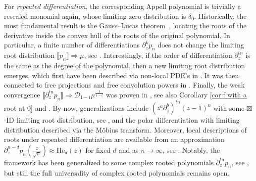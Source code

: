 \documentclass[reqno]{amsart}
\newcommand{\1}{\mathbf{1}}
\theoremstyle{plain}
\theoremstyle{definition}
\theoremstyle{remark}
\numberwithin{equation}{section}
\begin{document}
 For \emph{repeated differentiation}, the corresponding Appell polynomial is trivially a rescaled monomial again, whose limiting zero distribution is $\delta_0$. Historically, the most fundamental result is the Gauss--Lucas theorem~\cite[Theorem 6.1]{Marden}, locating the roots of the derivative inside the convex hull of the roots of the original polynomial. In particular, a finite number of differentiations $\partial_z^kp_n$ does not change the limiting root distribution $\llbracket p_n\rrbracket\Rightarrow \mu$, see \cite{Byun-Lee-Reddy2022,totik,Michelen-Vu2024,Angst-Malicet-Poly2024,angst2026convergence,michelen2024almost}. Interestingly, if the order of differentiation $\partial_z^{tn}$ is the same as the degree of the polynomial, then a new limiting root distribution emerges, which first have been described via non-local PDE's in
\cite{Steinerberger2019}. It was then connected to free projections and free convolution powers in \cite{Shlaykhtenko-Tao2020,Steinerberger2020,martinez2024flow,kiselev2022flow}. Finally, the weak convergence $\llbracket \partial_z^{tn}p_n\rrbracket\Rightarrow \mathcal D_{1-t}\mu^{\frac{1}{1-t}}$ was proven in \cite{Hoskins-Kabluchko2021}, see also Corollary \ref{cor:f with a root at 0} and \cite{Arizmendi-GarzaVargas-Perales2023}. By now, generalizations include $(z^a\partial_z^b)^{tn}(z-1)^n$ with some $\boxtimes$-ID limiting root distribution, see \cite{Jalowy-Kabluchko-Marynych2025}, and the polar differentiation with limiting distribution described via the M\"obius transform. Moreover, local descriptions of roots under repeated differentiation are available from an approximation $\partial_z^{n-d} p_n(\tfrac{z}{\sqrt n})\approx \mathrm{He}_d(z)$ for fixed $d$ and as $n\to\infty$, see \cite{Hoskins-Steinerberger2022, Campbell-ORourke-Renfrew2024even,Arizmendi-Campbell-Fujie2025,Gorin-Klepttsyn2020universal}. Notably, the framework has been generalized to some complex rooted polynomials $\partial_z^{tn} p_n$, see \cite{Campbell-ORourke-Renfrew2024,BHS24,Hall-Ho-Jalowy-Kabluchko2023Repeat,GNV25}, but still the full universality of complex rooted polynomials remains open.
\end{document}
